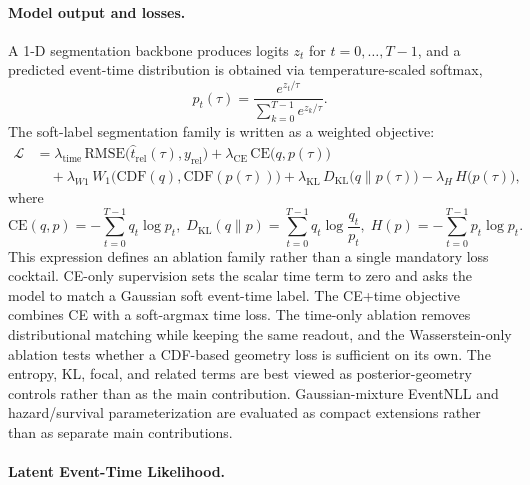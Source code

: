 \documentclass[12pt]{article}
\begin{document}
\paragraph{Model output and losses.}
A 1-D segmentation backbone produces logits $z_t$ for $t=0,\dots,T-1$, and a predicted
event-time distribution is obtained via temperature-scaled softmax,
\begin{equation}
\label{eq:rt_pred_dist}
p_t(\tau)=\frac{e^{z_t/\tau}}{\sum_{k=0}^{T-1} e^{z_k/\tau}}.
\end{equation}
The soft-label segmentation family is written as a weighted objective:
\begin{equation}
\label{eq:rt_loss}
\begin{aligned}
\mathcal{L}
&= \lambda_{\text{time}}\,\mathrm{RMSE}\big(\hat t_{\mathrm{rel}}(\tau), y_{\mathrm{rel}}\big)
 + \lambda_{\text{CE}}\,\mathrm{CE}\big(q, p(\tau)\big) \\
&\quad + \lambda_{W1}\,W_1\big(\mathrm{CDF}(q), \mathrm{CDF}(p(\tau))\big)
 + \lambda_{\text{KL}}\,D_{\mathrm{KL}}\big(q\|p(\tau)\big)
 - \lambda_{H}\,H\big(p(\tau)\big),
\end{aligned}
\end{equation}
where  
\begin{equation*}
\mathrm{CE}(q,p)=-\sum_{t=0}^{T-1} q_t \log p_t, \;
D_{\mathrm{KL}}(q\|p)=\sum_{t=0}^{T-1} q_t \log\frac{q_t}{p_t}, \;
H(p)=-\sum_{t=0}^{T-1} p_t \log p_t.
\end{equation*}
This expression defines an ablation family rather than a single mandatory loss cocktail. CE-only supervision sets the scalar time term to zero and asks the model to match a Gaussian soft event-time label. The CE+time objective combines CE with a soft-argmax time loss. The time-only ablation removes distributional matching while keeping the same readout, and the Wasserstein-only ablation tests whether a CDF-based geometry loss is sufficient on its own. The entropy, KL, focal, and related terms are best viewed as posterior-geometry controls rather than as the main contribution. Gaussian-mixture EventNLL and hazard/survival parameterization are evaluated as compact extensions rather than as separate main contributions.

\paragraph{Latent Event-Time Likelihood.}
\end{document}
